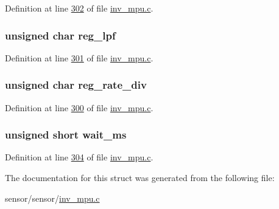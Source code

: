 Definition at line \hyperlink{inv__mpu_8c_source_l00302}{302} of file \hyperlink{inv__mpu_8c_source}{inv\+\_\+mpu.\+c}.

\subsubsection[{\texorpdfstring{reg\+\_\+lpf}{reg_lpf}}]{\setlength{\rightskip}{0pt plus 5cm}unsigned char reg\+\_\+lpf}\hypertarget{structtest__s_a794ee75f43ca70e89a68b43642eb2c59}{}\label{structtest__s_a794ee75f43ca70e89a68b43642eb2c59}


Definition at line \hyperlink{inv__mpu_8c_source_l00301}{301} of file \hyperlink{inv__mpu_8c_source}{inv\+\_\+mpu.\+c}.

\subsubsection[{\texorpdfstring{reg\+\_\+rate\+\_\+div}{reg_rate_div}}]{\setlength{\rightskip}{0pt plus 5cm}unsigned char reg\+\_\+rate\+\_\+div}\hypertarget{structtest__s_a82f9074fa4cc93f3d21f826a9e739294}{}\label{structtest__s_a82f9074fa4cc93f3d21f826a9e739294}


Definition at line \hyperlink{inv__mpu_8c_source_l00300}{300} of file \hyperlink{inv__mpu_8c_source}{inv\+\_\+mpu.\+c}.

\subsubsection[{\texorpdfstring{wait\+\_\+ms}{wait_ms}}]{\setlength{\rightskip}{0pt plus 5cm}unsigned short wait\+\_\+ms}\hypertarget{structtest__s_a0abed830f8dc38c7bd17ce78ee2530d8}{}\label{structtest__s_a0abed830f8dc38c7bd17ce78ee2530d8}


Definition at line \hyperlink{inv__mpu_8c_source_l00304}{304} of file \hyperlink{inv__mpu_8c_source}{inv\+\_\+mpu.\+c}.



The documentation for this struct was generated from the following file\+:\begin{DoxyCompactItemize}
\item 
sensor/sensor/\hyperlink{inv__mpu_8c}{inv\+\_\+mpu.\+c}\end{DoxyCompactItemize}
